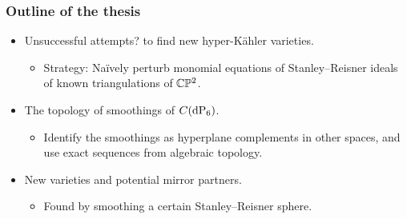\begin{frame}
\frametitle{Outline of the thesis}

\begin{itemize}
    \item<1->
    Unsuccessful attempt\alert{s?} to find new hyper-Kähler varieties.
    \begin{itemize}
        \item
	Strategy: Naïvely perturb monomial equations of Stanley--Reisner ideals of known triangulations of $\mathbb{C} \mathbb{P}^2$.
    \end{itemize}

    \item<2->
    The topology of smoothings of $C(\dP6)$.
    \begin{itemize}
        \item
        Identify the smoothings as hyperplane complements in other spaces, and use exact sequences from algebraic topology.
    \end{itemize}

    \item<3->
    New \CY varieties and potential mirror partners.
    \begin{itemize}
        \item
        Found by smoothing a certain Stanley--Reisner sphere.
    \end{itemize}
\end{itemize}

\end{frame}

